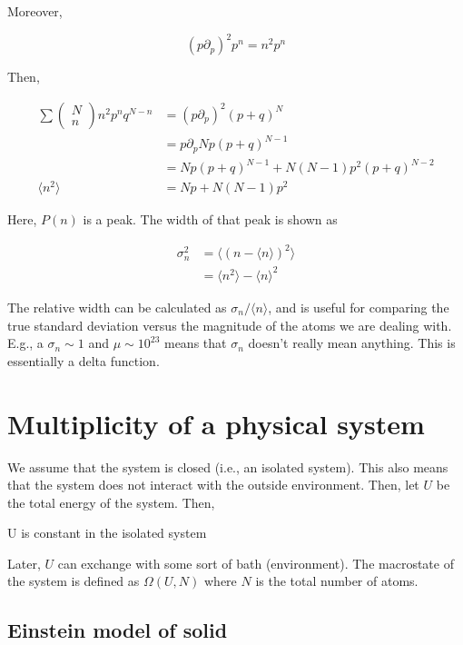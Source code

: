 \documentclass{article}
\newtheorem{one minute paper}[theorem]{One Minute Paper}
\begin{document}
Moreover, 

\begin{equation}
    \left( p \partial_p \right)^2 p^{n} = n^2 p^n
\end{equation}

Then, 

\begin{align}
    \sum \begin{pmatrix}
        N \\
        n
    \end{pmatrix}n^2 p^n q^{N-n} &= \left( p \partial_p \right)^2 (p + q)^N \\
    &= p \partial_p Np(p + q)^{N-1} \\
    &= Np(p + q)^{N-1} + N(N-1)p^2(p +q)^{N-2} \\
    \langle n^2 \rangle &= Np + N(N-1)p^2
\end{align}

Here, $P(n)$ is a peak. The width of that peak is shown as 

\begin{align}
    \sigma_n^2 &= \langle (n - \langle n \rangle)^2 \rangle \\
    &= \langle n^2 \rangle  - \langle n \rangle^2
\end{align}

The relative width can be calculated as $\sigma_n / \langle n \rangle$, and is useful for comparing the true standard deviation versus the magnitude of the atoms we are dealing with.
E.g., a $\sigma_n \sim 1$ and $\mu \sim 10^{23}$ means that $\sigma_n$ doesn't really mean anything. This is essentially a delta function. 

\section*{Multiplicity of a physical system}

We assume that the system is closed (i.e., an isolated system). This also means that the system does not interact with the outside environment. Then, let $U$ be the total energy of the system. Then,

\begin{center}
    U is constant in the isolated system
\end{center}

Later, $U$ can exchange with some sort of bath (environment). The macrostate of the system is defined as $\Omega(U,N)$ where $N$ is the total number of atoms. 

\subsection*{Einstein model of solid}
\end{document}
